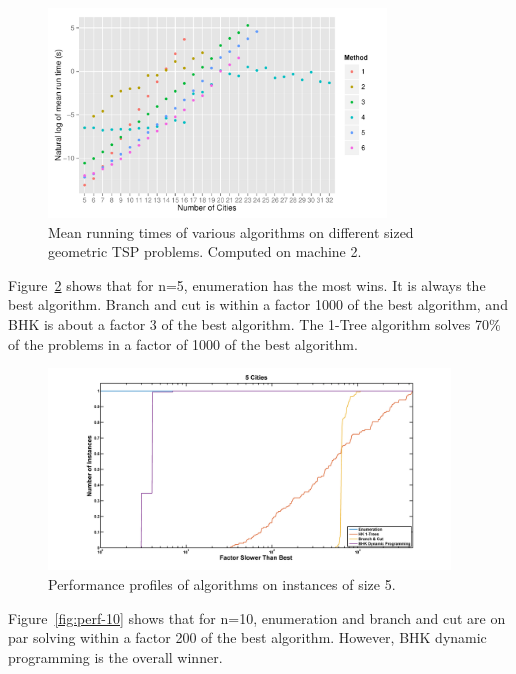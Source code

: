 \documentclass[11pt]{article}
\begin{document}
	\begin{figure}[H]
		\center
		\includegraphics[width=0.8\textwidth]{b40-log}
		\caption{Mean running times of various algorithms on different sized geometric TSP problems. Computed on machine 2.}
		\label{fig:m2-runtime}
	\end{figure}
	
	Figure~\ref{fig:perf-5} shows that for n=5, enumeration has the most wins. It is always the best algorithm. Branch and cut is within a factor 1000 of the best algorithm, and BHK is about a factor 3 of the best algorithm. The 1-Tree algorithm solves 70\% of the problems in a factor of 1000 of the best algorithm. 

	\begin{figure}[H]
		\center
		\includegraphics[width=0.95\textwidth]{../performanceplots/perf5_norm.png}
		\caption{Performance profiles of algorithms on instances of size 5.}
		\label{fig:perf-5}
	\end{figure}
	
	Figure~\ref{fig:perf-10} shows that for n=10, enumeration and branch and cut are on par solving within a factor 200 of the best algorithm. However, BHK dynamic programming is the overall winner. 
		
\end{document}
